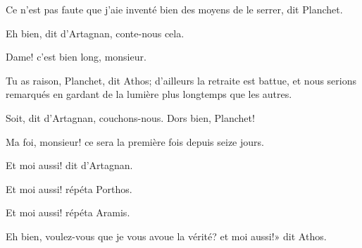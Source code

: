 \speak  Ce n'est pas faute que j'aie inventé bien des moyens de le serrer, dit Planchet. 

\speak  Eh bien, dit d'Artagnan, conte-nous cela. 

\speak  Dame! c'est bien long, monsieur. 

\speak  Tu as raison, Planchet, dit Athos; d'ailleurs la retraite est battue, et nous serions remarqués en gardant de la lumière plus longtemps que les autres. 

\speak  Soit, dit d'Artagnan, couchons-nous. Dors bien, Planchet! 

\speak  Ma foi, monsieur! ce sera la première fois depuis seize jours. 

\speak  Et moi aussi! dit d'Artagnan. 

\speak  Et moi aussi! répéta Porthos. 

\speak  Et moi aussi! répéta Aramis. 

\speak  Eh bien, voulez-vous que je vous avoue la vérité? et moi aussi!» dit Athos.